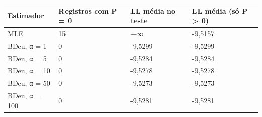 \begin{tabular}{llll}
\toprule
Estimador & Registros com P = 0 & LL média no teste & LL média (só P > 0) \\
\midrule
MLE & 15 & −∞ & -9,5157 \\
BDeu, α = 1 & 0 & -9,5299 & -9,5299 \\
BDeu, α = 5 & 0 & -9,5284 & -9,5284 \\
BDeu, α = 10 & 0 & -9,5278 & -9,5278 \\
BDeu, α = 50 & 0 & -9,5273 & -9,5273 \\
BDeu, α = 100 & 0 & -9,5281 & -9,5281 \\
\bottomrule
\end{tabular}

